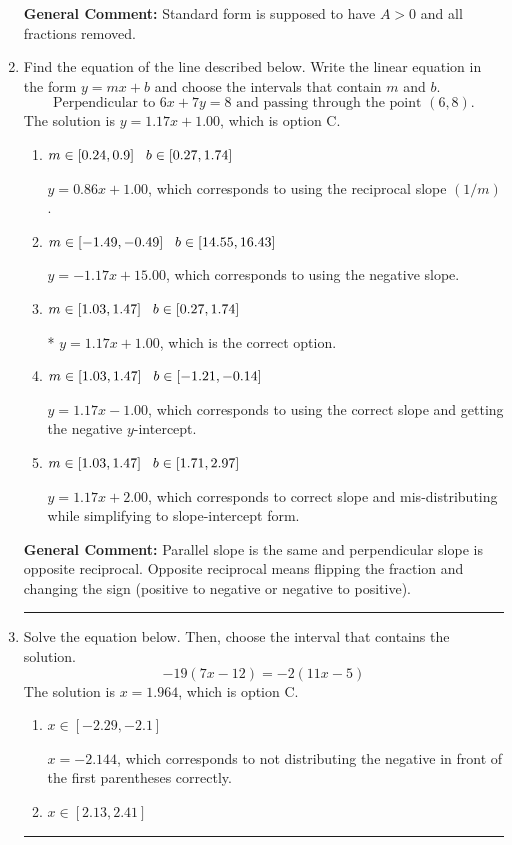 \documentclass{extbook}[14pt]
\newcommand{\litem}[1]{\item #1

\rule{\textwidth}{0.4pt}}
\begin{document}
\begin{enumerate}
{\textbf{General Comment:} Standard form is supposed to have $A > 0$ and all fractions removed.
}
\litem{
Find the equation of the line described below. Write the linear equation in the form $ y=mx+b $ and choose the intervals that contain $m$ and $b$.
\[ \text{Perpendicular to } 6 x + 7 y = 8 \text{ and passing through the point } (6, 8). \]The solution is \( y = 1.17x + 1.00 \), which is option C.\begin{enumerate}[label=\Alph*.]
\item \( m \in [0.24, 0.9] \hspace*{3mm} b \in [0.27, 1.74] \)

 $y = 0.86x + 1.00$, which corresponds to using the reciprocal slope $(1/m)$.
\item \( m \in [-1.49, -0.49] \hspace*{3mm} b \in [14.55, 16.43] \)

 $y = -1.17x + 15.00$, which corresponds to using the negative slope.
\item \( m \in [1.03, 1.47] \hspace*{3mm} b \in [0.27, 1.74] \)

* $y = 1.17x + 1.00$, which is the correct option.
\item \( m \in [1.03, 1.47] \hspace*{3mm} b \in [-1.21, -0.14] \)

 $y = 1.17x - 1.00$, which corresponds to using the correct slope and getting the negative $y$-intercept.
\item \( m \in [1.03, 1.47] \hspace*{3mm} b \in [1.71, 2.97] \)

 $y = 1.17x + 2.00$, which corresponds to correct slope and mis-distributing while simplifying to slope-intercept form.
\end{enumerate}

\textbf{General Comment:} Parallel slope is the same and perpendicular slope is opposite reciprocal. Opposite reciprocal means flipping the fraction and changing the sign (positive to negative or negative to positive).
}
\litem{
Solve the equation below. Then, choose the interval that contains the solution.
\[ -19(7x -12) = -2(11x -5) \]The solution is \( x = 1.964 \), which is option C.\begin{enumerate}[label=\Alph*.]
\item \( x \in [-2.29, -2.1] \)

$x = -2.144$, which corresponds to not distributing the negative in front of the first parentheses correctly.
\item \( x \in [2.13, 2.41] \)


\end{enumerate}}
\end{enumerate}
\end{document}

